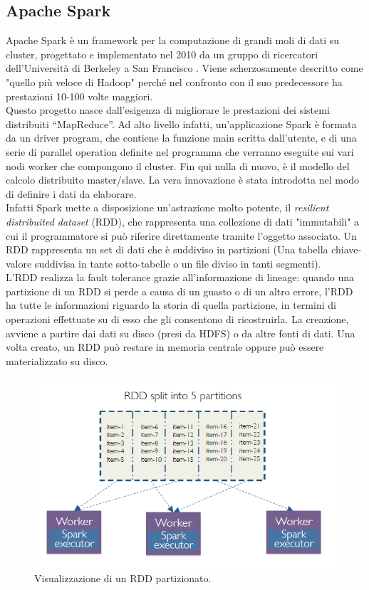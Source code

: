 \subsection{Apache Spark}
\label{sec:spark}
Apache Spark è un framework per la computazione di grandi moli di dati
su cluster, progettato e implementato nel 2010 da un gruppo di ricercatori dell’Università di Berkeley a San Francisco \cite{spark:hadoop}. Viene scherzosamente descritto come "quello più veloce di Hadoop" perché nel confronto con il suo predecessore ha prestazioni 10-100 volte maggiori.
\\Questo progetto nasce dall'esigenza di migliorare le prestazioni dei sistemi distribuiti “MapReduce”. Ad alto livello infatti, un'applicazione Spark è formata da un driver program, che contiene la funzione main scritta dall'utente, e di una serie di parallel operation definite nel programma che verranno eseguite sui vari nodi worker che compongono il cluster. Fin qui nulla di nuovo, è il modello del calcolo distribuito master/slave. La vera innovazione è stata introdotta nel modo di definire i dati da elaborare.
\\Infatti Spark mette a disposizione un'astrazione molto potente, il \textit{resilient distribuited dataset} (RDD), che rappresenta una collezione di dati "immutabili" a cui il programmatore si può riferire direttamente tramite l'oggetto associato. Un RDD rappresenta un set di dati che è suddiviso in partizioni (Una tabella chiave-valore suddivisa in tante sotto-tabelle o un file diviso in tanti segmenti). 
\\L’RDD realizza la fault tolerance grazie all'informazione di lineage: quando una partizione di un RDD si perde a causa di un guasto o di un altro errore, l’RDD ha tutte le informazioni riguardo la storia di quella partizione, in termini di operazioni effettuate su di esso che gli consentono di ricostruirla. La creazione, avviene a partire dai dati su disco (presi da HDFS) o da altre fonti di dati. Una volta creato, un RDD può restare in memoria centrale oppure può essere materializzato su disco.
\begin{figure}[H]
	\centering
	\includegraphics[width=\textwidth]{images/sparkRDD.png}
	\caption{Visualizzazione di un RDD partizionato.}
	\label{fig:sparkRDD}
\end{figure}
